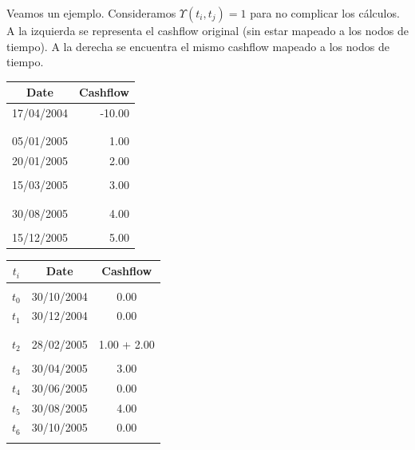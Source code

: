 Veamos un ejemplo. Consideramos $\Upsilon(t_i,t_j)=1$ para no complicar los c\'alculos.
A la izquierda se representa el cashflow original (sin estar mapeado a los nodos de
tiempo). A la derecha se encuentra el mismo cashflow mapeado a los nodos de tiempo.
\newline
\newline
\begin{minipage}[c]{0.5\columnwidth}%
\centering
\begin{tabular}{c|r}
\textbf{Date} & \textbf{Cashflow} \\
\hline
17/04/2004 & -10.00 \\
           &        \\
           &        \\
05/01/2005 &   1.00 \\
20/01/2005 &   2.00 \\
           &        \\
15/03/2005 &   3.00 \\
           &        \\
           &        \\
30/08/2005 &   4.00 \\
           &        \\
15/12/2005 &   5.00 \\
\end{tabular}
\end{minipage}%
\begin{minipage}[c]{0.5\columnwidth}%
\centering
\begin{tabular}{c|c|c}
\textbf{$t_i$} & \textbf{Date}  & \textbf{Cashflow} \\
\hline
      &            &      \\
$t_0$ & 30/10/2004 & 0.00 \\
$t_1$ & 30/12/2004 & 0.00 \\
      &            &      \\
      &            &      \\
$t_2$ & 28/02/2005 & 1.00 + 2.00 \\
      &            &      \\
$t_3$ & 30/04/2005 & 3.00 \\
$t_4$ & 30/06/2005 & 0.00 \\
$t_5$ & 30/08/2005 & 4.00 \\
$t_6$ & 30/10/2005 & 0.00 \\
      &            &      \\
\end{tabular}
\end{minipage}%

